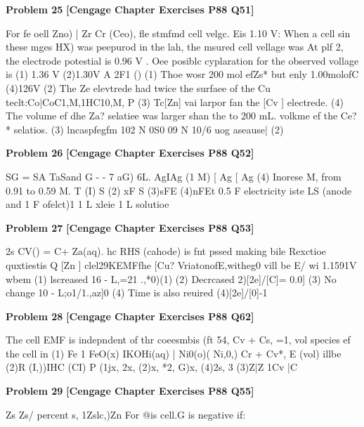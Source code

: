 \begin{problembox}
\textbf{Problem 25} \hfill \textbf{[Cengage Chapter Exercises P88 Q51]}
\label{q:ext-cng-th-25}

For fe oell Zno) | Zr  Cr  (Ceo), fle stmfmd cell
velgc. Eis 1.10 V: When a cell sin these mges
HX)
was peepurod in the lah, the msured cell vellage was
At plf  2, the electrode potestial is
0.96 V . Oee posiblc cyplaration for the observed vollage is
(1) 1.36 V
(2)1.30V
A 2F1 ()
(1) Thoe wosr 200 mol efZs* but enly 1.00molofC
(4)126V
(2) The Ze elevtrede had twice the surfaee of the Cu
teclt:Co|CoC1,M,1HC10,M, P
(3) Tc[Zn] vai larpor fan the [Cv ]
electrede.
(4) The volume ef dhe Za? selatiee was larger shan the
to 200 mL.
volkme ef the Ce?* selatios.
(3) lncaspfegfm 102
N 0S0 09 N 10/6 uog  aseause| (2)
\end{problembox}

\begin{problembox}
\textbf{Problem 26} \hfill \textbf{[Cengage Chapter Exercises P88 Q52]}
\label{q:ext-cng-th-26}

SG = SA TaSand
G -  - 7
aG)
6L. AgIAg (1 M) [ Ag  [ Ag
(4) Inorese M, from 0.91 to 0.59 M.
T
(I)
S
(2)
xF
S
(3)sFE
(4)nFEt
0.5 F electricity iste LS (anode and 1 F ofelct)1
1 L xleie
1 L solutioe
\end{problembox}

\begin{problembox}
\textbf{Problem 27} \hfill \textbf{[Cengage Chapter Exercises P88 Q53]}
\label{q:ext-cng-th-27}

2s  CV() = C+ Za(aq).
hc RHS (cahode) is fnt pssed making bile
Rexctioe quxtiestis Q
[Zn  ]
clel29KEMFfhe
[Cu?
VriatonofE,witheg0
vill be
E/  wi  1.1591V wbem
(1) lscreased
16  - L,=21 .,*0)(1)
(2) Decrcased
2)[2e]/[C]= 0.0]
(3) No change
10 - L;o1/1.,az]0
(4) Time is also reuired
(4)[2e]/[0]-1
\end{problembox}

\begin{problembox}
\textbf{Problem 28} \hfill \textbf{[Cengage Chapter Exercises P88 Q62]}
\label{q:ext-cng-th-28}

The cell EMF is indepndent of thr coeesmbis (ft
54, Cv +  Cs, =1, vol
species ef the cell in
(1) Fe 1 FeO(x) IKOHi(aq) | Ni0(o)( Ni,0,)
Cr +    Cv*, E (vol) illbe
(2)R (I,))IHC (CI) P
(1jx, 2x, (2)x, *2, G)x, 
(4)2s, 3
(3)Z|Z 1Cv |C
\end{problembox}

\begin{problembox}
\textbf{Problem 29} \hfill \textbf{[Cengage Chapter Exercises P88 Q55]}
\label{q:ext-cng-th-29}

Zs Zs/ percent s, 1Zslc,)Zn For @is cell.G is negative if:
\end{problembox}


